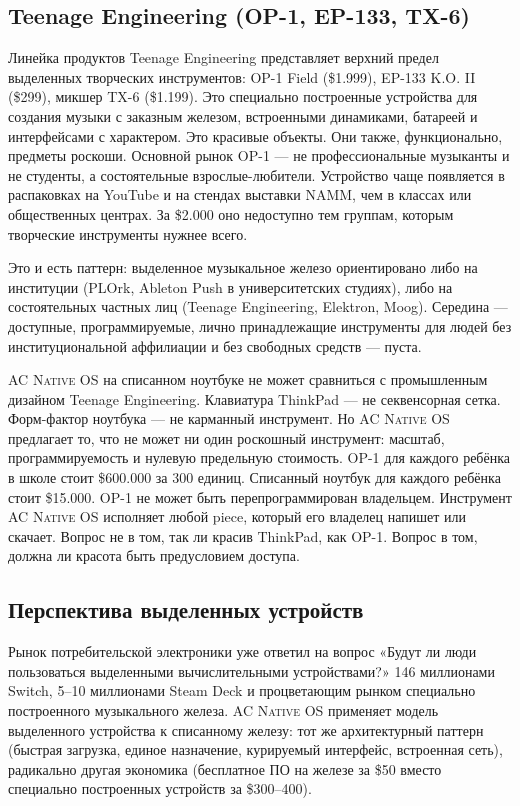\documentclass[10pt,letterpaper,twocolumn]{article}
\newcommand{\acos}{\textsc{AC Native OS}}
\begin{document}
\subsection{Teenage Engineering (OP-1, EP-133, TX-6)}

Линейка продуктов Teenage Engineering представляет верхний предел выделенных творческих инструментов: OP-1 Field (\$1.999), EP-133 K.O. II (\$299), микшер TX-6 (\$1.199). Это специально построенные устройства для создания музыки с заказным железом, встроенными динамиками, батареей и интерфейсами с характером. Это красивые объекты. Они также, функционально, предметы роскоши. Основной рынок OP-1 --- не профессиональные музыканты и не студенты, а состоятельные взрослые-любители. Устройство чаще появляется в распаковках на YouTube и на стендах выставки NAMM, чем в классах или общественных центрах. За \$2.000 оно недоступно тем группам, которым творческие инструменты нужнее всего.

Это и есть паттерн: выделенное музыкальное железо ориентировано либо на институции (PLOrk, Ableton Push в университетских студиях), либо на состоятельных частных лиц (Teenage Engineering, Elektron, Moog). Середина --- доступные, программируемые, лично принадлежащие инструменты для людей без институциональной аффилиации и без свободных средств --- пуста.

\acos{} на списанном ноутбуке не может сравниться с промышленным дизайном Teenage Engineering. Клавиатура ThinkPad --- не секвенсорная сетка. Форм-фактор ноутбука --- не карманный инструмент. Но \acos{} предлагает то, что не может ни один роскошный инструмент: масштаб, программируемость и нулевую предельную стоимость. OP-1 для каждого ребёнка в школе стоит \$600.000 за 300 единиц. Списанный ноутбук для каждого ребёнка стоит \$15.000. OP-1 не может быть перепрограммирован владельцем. Инструмент \acos{} исполняет любой piece, который его владелец напишет или скачает. Вопрос не в том, так ли красив ThinkPad, как OP-1. Вопрос в том, должна ли красота быть предусловием доступа.

\subsection{Перспектива выделенных устройств}

Рынок потребительской электроники уже ответил на вопрос «Будут ли люди пользоваться выделенными вычислительными устройствами?» 146 миллионами Switch, 5--10 миллионами Steam Deck и процветающим рынком специально построенного музыкального железа. \acos{} применяет модель выделенного устройства к списанному железу: тот же архитектурный паттерн (быстрая загрузка, единое назначение, курируемый интерфейс, встроенная сеть), радикально другая экономика (бесплатное ПО на железе за \$50 вместо специально построенных устройств за \$300--400).
\end{document}

